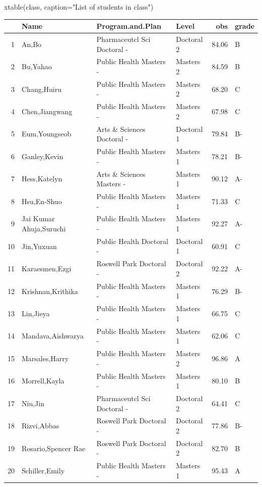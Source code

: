 \documentclass[letterpaper]{article}
\begin{document}
\begin{enumerate}
xtable(class, caption="List of students in class")
\begin{table}[ht]
\centering
\begin{tabular}{rlllrl}
  \hline
 & Name & Program.and.Plan & Level & obs & grade \\ 
  \hline
1 & An,Bo & Pharmaceutcl Sci Doctoral -  & Doctoral 2 & 84.06 & B \\ 
  2 & Bu,Yahao & Public Health Masters -  & Masters 2 & 84.59 & B \\ 
  3 & Chang,Huiru & Public Health Masters -  & Masters 2 & 68.20 & C \\ 
  4 & Chen,Jiangwang & Public Health Masters -  & Masters 2 & 67.98 & C \\ 
  5 & Eum,Youngseob & Arts \& Sciences Doctoral -  & Doctoral 1 & 79.84 & B- \\ 
  6 & Ganley,Kevin & Public Health Masters -  & Masters 1 & 78.21 & B- \\ 
  7 & Hess,Katelyn & Arts \& Sciences Masters -  & Masters 1 & 90.12 & A- \\ 
  8 & Hsu,En-Shuo & Public Health Masters -  & Masters 1 & 71.33 & C \\ 
  9 & Jai Kumar Ahuja,Suruchi & Public Health Masters -  & Masters 1 & 92.27 & A- \\ 
  10 & Jin,Yuxuan & Public Health Doctoral -  & Doctoral 1 & 60.91 & C \\ 
  11 & Karaesmen,Ezgi & Roswell Park Doctoral -  & Doctoral 2 & 92.22 & A- \\ 
  12 & Krishnan,Krithika & Public Health Masters -  & Masters 1 & 76.29 & B- \\ 
  13 & Lin,Jieya & Public Health Masters -  & Masters 1 & 66.75 & C \\ 
  14 & Mandava,Aishwarya & Public Health Masters -  & Masters 1 & 62.06 & C \\ 
  15 & Marsales,Harry & Public Health Masters -  & Masters 2 & 96.86 & A \\ 
  16 & Morrell,Kayla & Public Health Masters -  & Masters 1 & 80.10 & B \\ 
  17 & Niu,Jin & Pharmaceutcl Sci Doctoral -  & Doctoral 2 & 64.41 & C \\ 
  18 & Rizvi,Abbas & Roswell Park Doctoral -  & Doctoral 2 & 77.86 & B- \\ 
  19 & Rosario,Spencer Rae & Roswell Park Doctoral -  & Doctoral 2 & 82.70 & B \\ 
  20 & Schiller,Emily & Public Health Masters -  & Masters 1 & 95.43 & A \\ 

\end{tabular}
\end{table}
\end{enumerate}
\end{document}
